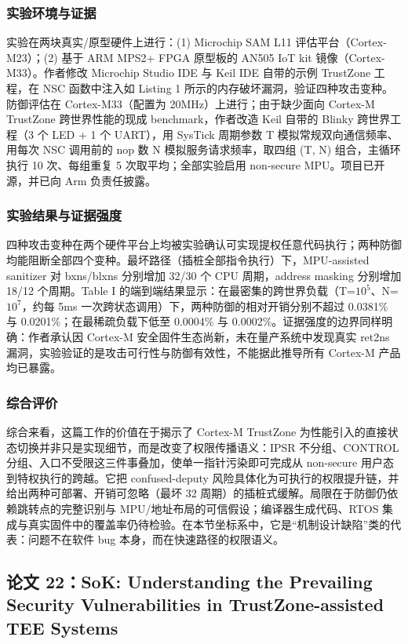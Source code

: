 \documentclass[11pt]{ctexart}
\begin{document}
\subsubsection{实验环境与证据}
实验在两块真实/原型硬件上进行：(1) Microchip SAM L11 评估平台（Cortex-M23）；(2) 基于 ARM MPS2+ FPGA 原型板的 AN505 IoT kit 镜像（Cortex-M33）。作者修改 Microchip Studio IDE 与 Keil IDE 自带的示例 TrustZone 工程，在 NSC 函数中注入如 Listing 1 所示的内存破坏漏洞，验证四种攻击变种。防御评估在 Cortex-M33（配置为 20MHz）上进行；由于缺少面向 Cortex-M TrustZone 跨世界性能的现成 benchmark，作者改造 Keil 自带的 Blinky 跨世界工程（3 个 LED + 1 个 UART），用 SysTick 周期参数 T 模拟常规双向通信频率、用每次 NSC 调用前的 nop 数 N 模拟服务请求频率，取四组 (T, N) 组合，主循环执行 10 次、每组重复 5 次取平均；全部实验启用 non-secure MPU。项目已开源，并已向 Arm 负责任披露。\par
\subsubsection{实验结果与证据强度}
四种攻击变种在两个硬件平台上均被实验确认可实现提权任意代码执行；两种防御均能阻断全部四个变种。最坏路径（插桩全部指令执行）下，MPU-assisted sanitizer 对 bxns/blxns 分别增加 32/30 个 CPU 周期，address masking 分别增加 18/12 个周期。Table I 的端到端结果显示：在最密集的跨世界负载（T=$10^5$、N=$10^7$，约每 5ms 一次跨状态调用）下，两种防御的相对开销分别不超过 0.0381\% 与 0.0201\%；在最稀疏负载下低至 0.0004\% 与 0.0002\%。证据强度的边界同样明确：作者承认因 Cortex-M 安全固件生态尚新，未在量产系统中发现真实 ret2ns 漏洞，实验验证的是攻击可行性与防御有效性，不能据此推导所有 Cortex-M 产品均已暴露。\par
\subsubsection{综合评价}
综合来看，这篇工作的价值在于揭示了 Cortex-M TrustZone 为性能引入的直接状态切换并非只是实现细节，而是改变了权限传播语义：IPSR 不分组、CONTROL 分组、入口不受限这三件事叠加，使单一指针污染即可完成从 non-secure 用户态到特权执行的跨越。它把 confused-deputy 风险具体化为可执行的权限提升链，并给出两种可部署、开销可忽略（最坏 32 周期）的插桩式缓解。局限在于防御仍依赖跳转点的完整识别与 MPU/地址布局的可信假设；编译器生成代码、RTOS 集成与真实固件中的覆盖率仍待检验。在本节坐标系中，它是``机制设计缺陷''类的代表：问题不在软件 bug 本身，而在快速路径的权限语义。\par

\subsection{论文 22：SoK: Understanding the Prevailing Security Vulnerabilities in TrustZone-assisted TEE Systems}
\end{document}
